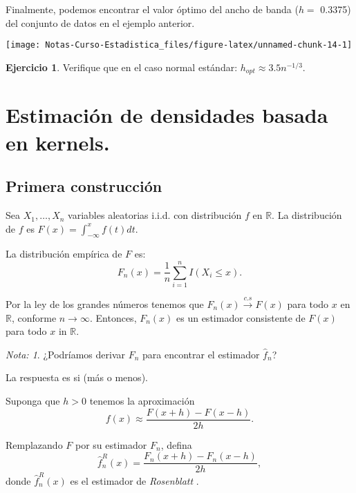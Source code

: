 \documentclass[
  12pt,
]{book}
\theoremstyle{definition}
\theoremstyle{definition}
\theoremstyle{definition}
\newtheorem{exercise}{Ejercicio}[chapter]
\theoremstyle{definition}
\theoremstyle{remark}
\newtheorem*{remark}{Nota: }
\begin{document}
Finalmente, podemos encontrar el valor óptimo del ancho de banda (\(h=\) 0.3375) del conjunto de datos en el ejemplo anterior.

\begin{center}\texttt{[image: Notas-Curso-Estadistica\_files/figure-latex/unnamed-chunk-14-1]} \end{center}

\begin{exercise}
\protect\hypertarget{exr:unnamed-chunk-15}{}\label{exr:unnamed-chunk-15}Verifique que en el caso normal estándar: \(h_{opt}\approx 3.5 n^{-1/3}\).
\end{exercise}

\hypertarget{estimaciuxf3n-de-densidades-basada-en-kernels.}{%
\section{Estimación de densidades basada en kernels.}\label{estimaciuxf3n-de-densidades-basada-en-kernels.}}

\hypertarget{primera-construcciuxf3n}{%
\subsection{Primera construcción}\label{primera-construcciuxf3n}}

Sea \(X_{1},\ldots,X_{n}\) variables aleatorias i.i.d. con distribución \(f\) en \(\mathbb{R}\). La distribución de \(f\) es \(F(x)=\int_{-\infty}^{x}f(t)dt\).

La distribución empírica de \(F\) es:
\[
F_{n}(x)=\frac{1}{n}\sum_{i=1}^{n}I(X_{i}\leq x).
\]

Por la ley de los grandes números tenemos que \(F_{n}(x) \xrightarrow{c.s} F(x)\) para todo \(x\) en \(\mathbb{R}\), conforme
\(n\rightarrow\infty\). Entonces, \(F_{n}(x)\) es un estimador consistente de \(F(x)\) para todo \(x\) in \(\mathbb{R}\).

\begin{remark}
¿Podríamos derivar \(F_n\) para encontrar el estimador \(\hat{f}_n\)?
\end{remark}

La respuesta es si (más o menos).

Suponga que \(h>0\) tenemos la aproximación
\[
f(x)\approx\frac{F(x+h)-F(x-h)}{2h}.
\]

Remplazando \(F\) por su estimador \(F_{n}\), defina
\[
\hat{f}_{n}^{R}(x)=\frac{F_{n}(x+h)-F_{n}(x-h)}{2h},
\]
donde \(\hat{f}_{n}^{R}(x)\) es el estimador de \emph{Rosenblatt} .
\end{document}
